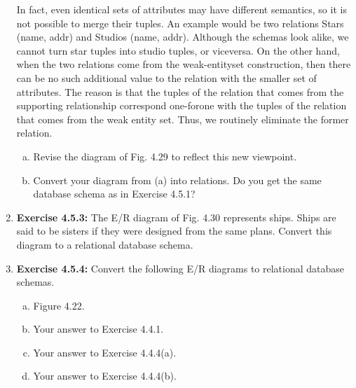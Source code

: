 \documentclass[12pt]{article}
\begin{document}
\begin{enumerate}[1.]
\begin{mdframed}
        \bigskip

        In fact, even identical sets of attributes may have different semantics,
        so it is not possible to merge their tuples. An example would be two
        relations Stars (name, addr) and Studios (name, addr). Although the
        schemas look alike, we cannot turn star tuples into studio tuples, or viceversa.
        On the other hand, when the two relations come from the weak-entityset
        construction, then there can be no such additional value to the relation
        with the smaller set of attributes. The reason is that the tuples of the
        relation that comes from the supporting relationship correspond one-forone
        with the tuples of the relation that comes from the weak entity set.
        Thus, we routinely eliminate the former relation.
    \end{mdframed}

    \bigskip

    \begin{enumerate}[a)]
        \item Revise the diagram of Fig. 4.29 to reflect this new viewpoint.
        \item Convert your diagram from (a) into relations. Do you get the same database schema as in Exercise 4.5.1?
    \end{enumerate}

    \item \textbf{Exercise 4.5.3:} The E/R diagram of Fig. 4.30 represents ships. Ships are said
    to be sisters if they were designed from the same plans. Convert this diagram
    to a relational database schema.

    \item \textbf{Exercise 4.5.4:} Convert the following E/R diagrams to relational database
    schemas.

    \begin{enumerate}[a)]
        \item Figure 4.22.
        \item Your answer to Exercise 4.4.1.
        \item Your answer to Exercise 4.4.4(a).
        \item Your answer to Exercise 4.4.4(b).
    \end{enumerate}


\end{enumerate}
\end{document}

